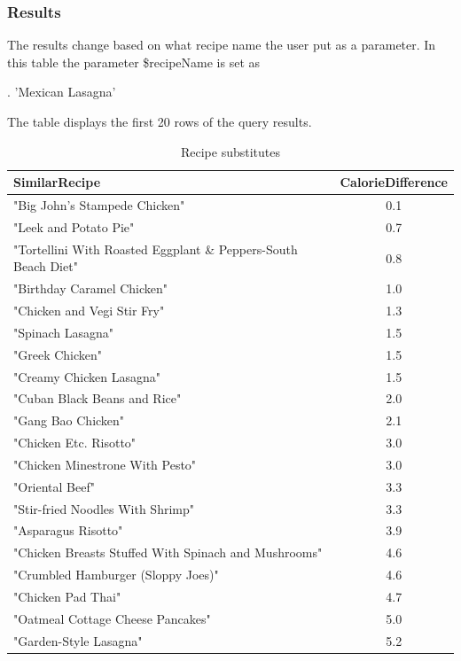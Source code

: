 \begin{enumerate}
        \subsubsection{Results}
    The results change based on what recipe name the user put as a parameter. In this table the parameter \$recipeName is set as 
\begin{CypherQuery}
.
'Mexican Lasagna'
\end{CypherQuery}
    The table displays the first 20 rows of the query results.
        \begin{table}[h!]
\centering
\begin{tabular}{lc}
\toprule
\textbf{SimilarRecipe} & \textbf{CalorieDifference} \\
\midrule
"Big John's Stampede Chicken" & 0.1 \\
"Leek and Potato Pie" & 0.7 \\
"Tortellini With Roasted Eggplant \& Peppers-South Beach Diet" & 0.8 \\
"Birthday Caramel Chicken" & 1.0 \\
"Chicken and Vegi Stir Fry" & 1.3 \\
"Spinach Lasagna" & 1.5 \\
"Greek Chicken" & 1.5 \\
"Creamy Chicken Lasagna" & 1.5 \\
"Cuban Black Beans and Rice" & 2.0 \\
"Gang Bao Chicken" & 2.1 \\
"Chicken Etc. Risotto" & 3.0 \\
"Chicken Minestrone With Pesto" & 3.0 \\
"Oriental Beef" & 3.3 \\
"Stir-fried Noodles With Shrimp" & 3.3 \\
"Asparagus Risotto" & 3.9 \\
"Chicken Breasts Stuffed With Spinach and Mushrooms" & 4.6 \\
"Crumbled Hamburger (Sloppy Joes)" & 4.6 \\
"Chicken Pad Thai" & 4.7 \\
"Oatmeal Cottage Cheese Pancakes" & 5.0 \\
"Garden-Style Lasagna" & 5.2 \\
\bottomrule
\end{tabular}
\caption{Recipe substitutes}
\label{tab:similar_recipes}
\end{table}

\end{enumerate}
